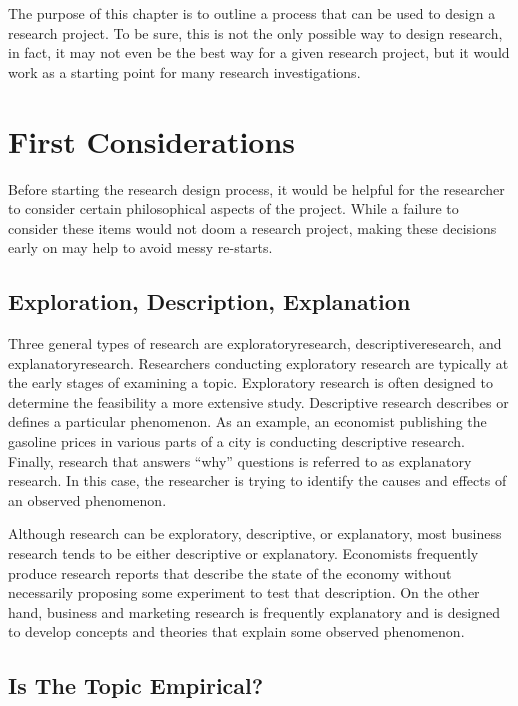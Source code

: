 The purpose of this chapter is to outline a process that can be used to design a research project. To be sure, this is not the only possible way to design research, in fact, it may not even be the best way for a given research project, but it would work as a starting point for many research investigations.

\section{First Considerations}

Before starting the research design process, it would be helpful for the researcher to consider certain philosophical aspects of the project. While a failure to consider these items would not doom a research project, making these decisions early on may help to avoid messy re-starts. 

\subsection{Exploration, Description, Explanation}

Three general types of research are \gls{exploratoryresearch}, \gls{descriptiveresearch}, and \gls{explanatoryresearch}. Researchers conducting exploratory research are typically at the early stages of examining a topic. Exploratory research is often designed to determine the feasibility a more extensive study. Descriptive research describes or defines a particular phenomenon. As an example, an economist publishing the gasoline prices in various parts of a city is conducting descriptive research. Finally, research that answers ``why'' questions is referred to as explanatory research. In this case, the researcher is trying to identify the causes and effects of an observed phenomenon.

Although research can be exploratory, descriptive, or explanatory, most business research tends to be either descriptive or explanatory. Economists frequently produce research reports that describe the state of the economy without necessarily proposing some experiment to test that description. On the other hand, business and marketing research is frequently explanatory and is designed to develop concepts and theories that explain some observed phenomenon.

\subsection{Is The Topic Empirical?}

